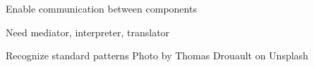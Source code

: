 \documentclass[Screen16to9,17pt]{foils}
\begin{document}



\begin{list2}
\item Enable communication between components
\item Need mediator, interpreter, translator
\item Recognize standard patterns \hfill Photo by Thomas Drouault on Unsplash
\end{list2}





\breakdance







\breakdance







\breakdance








\breakdance









\breakdance










\breakdance










\breakdance






\end{document}
